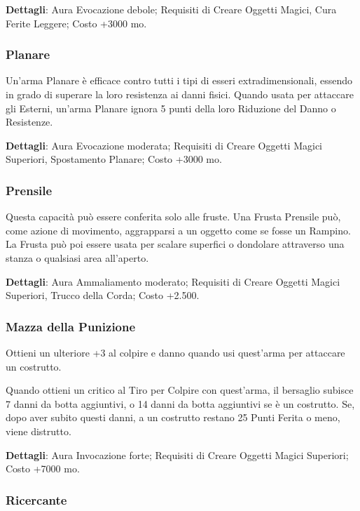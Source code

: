 \begin{multicols}{2}
\textbf{Dettagli}: Aura Evocazione debole; Requisiti di Creare Oggetti Magici, Cura Ferite Leggere; Costo +3000 mo.

\subsubsection*{Planare}

Un'arma Planare è efficace contro tutti i tipi di esseri extradimensionali, essendo in grado di superare la loro resistenza ai danni fisici. Quando usata per attaccare gli Esterni, un'arma Planare ignora 5 punti della loro Riduzione del Danno o Resistenze.

\textbf{Dettagli}: Aura Evocazione moderata; Requisiti di Creare Oggetti Magici Superiori, Spostamento Planare; Costo +3000 mo.

\subsubsection*{Prensile}

Questa capacità può essere conferita solo alle fruste. Una Frusta Prensile può, come azione di movimento, aggrapparsi a un oggetto come se fosse un Rampino. La Frusta può poi essere usata per scalare superfici o dondolare attraverso una stanza o qualsiasi area all'aperto.

\textbf{Dettagli}: Aura Ammaliamento moderato; Requisiti di Creare Oggetti Magici Superiori, Trucco della Corda; Costo +2.500.

\subsubsection*{Mazza della Punizione}

Ottieni un ulteriore +3 al colpire e danno quando usi quest'arma per attaccare un costrutto.

Quando ottieni un critico al Tiro per Colpire con quest'arma, il bersaglio subisce 7 danni da botta aggiuntivi, o 14 danni da botta aggiuntivi se è un costrutto. Se, dopo aver subito questi danni, a un costrutto restano 25 Punti Ferita o meno, viene distrutto.

\textbf{Dettagli}: Aura Invocazione forte; Requisiti di Creare Oggetti Magici Superiori; Costo +7000 mo.

\subsubsection*{Ricercante}


\end{multicols}

